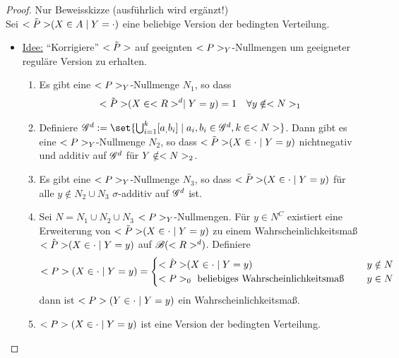 \begin{proof}
	Nur Beweisskizze (ausführlich wird ergänzt!)\\Sei $\tilde{\P}(X \in A \mid Y = \cdot)$ eine beliebige Version der bedingten Verteilung.
	\begin{itemize}
		\item \ul{Idee:} ``Korrigiere'' $\tilde{\P}$ auf geeignten $\P_Y$-Nullmengen um geeigneter reguläre Version zu erhalten.
		\begin{enumerate}
			\item Es gibt eine $\P_Y$-Nullmenge $N_1$, so dass
			\begin{align*}
				\tilde{\P}(X \in \Rd \mid Y = y) = 1 \quad \forall y \notin \N_1
			\end{align*}
			\item Definiere $\G^d := \set{\bigcup_{i = 1}^k [a_, b_i] \mid a_i, b_i \in \G^d, k \in \N}$. Dann gibt es eine $\P_Y$-Nullmenge $N_2$, so dass $\tilde{\P}(X \in \cdot \mid Y = y)$ nichtnegativ und additiv auf $\G^d$ für $Y \notin \N_2$.
			\item Es gibt eine $\P_Y$-Nullmenge $N_3$, so dass $\tilde{\P}(X \in \cdot \mid Y = y)$ für alle $y \notin N_2 \cup N_3$ $\sigma$-additiv auf $\G^d$ ist.
			\item Sei $N = N_1 \cup N_2 \cup N_3$ $\P_Y$-Nullmengen. Für $y \in N^C$ existiert eine Erweiterung von $\tilde{\P}(X \in \cdot \mid Y = y)$ zu einem Wahrscheinlichkeitsmaß $\hat{\P}(X \in \cdot \mid Y = y)$ auf $\borel(\Rd)$. Definiere
			\begin{align*}
				\P(X \in \cdot \mid Y = y) = \begin{cases}
				\hat{\P}(X \in \cdot \mid Y = y) & \quad y \notin N\\
				\P_0 \text{ beliebiges Wahrscheinlichkeitsmaß } & \quad y \in N
				\end{cases}
			\end{align*} 
			dann ist $\P(Y \in \cdot \mid Y = y)$ ein Wahrscheinlichkeitsmaß.
			\item $\P(X \in \cdot \mid Y = y)$ ist eine Version der bedingten Verteilung.
		\end{enumerate}
	
	\end{itemize}
\end{proof}